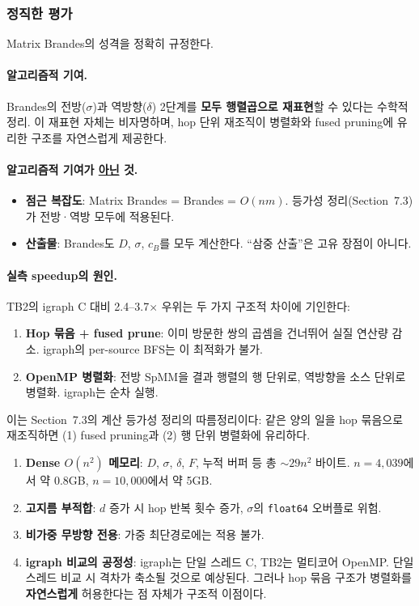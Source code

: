 \documentclass[11pt,a4paper]{article}
\begin{document}
\subsubsection{정직한 평가}

Matrix Brandes의 성격을 정확히 규정한다.

\paragraph{알고리즘적 기여.}
Brandes의 전방($\sigma$)과 역방향($\delta$) 2단계를 \textbf{모두 행렬곱으로 재표현}할 수 있다는 수학적 정리. 이 재표현 자체는 비자명하며, hop 단위 재조직이 병렬화와 fused pruning에 유리한 구조를 자연스럽게 제공한다.

\paragraph{알고리즘적 기여가 \underline{아닌} 것.}
\begin{itemize}
\item \textbf{점근 복잡도}: Matrix Brandes = Brandes = $O(nm)$. 등가성 정리(Section~7.3)가 전방·역방 모두에 적용된다.
\item \textbf{산출물}: Brandes도 $D$, $\sigma$, $c_B$를 모두 계산한다. ``삼중 산출''은 고유 장점이 아니다.
\end{itemize}

\paragraph{실측 speedup의 원인.}
TB2의 igraph C 대비 2.4--3.7$\times$ 우위는 두 가지 구조적 차이에 기인한다:
\begin{enumerate}
\item \textbf{Hop 묶음 + fused prune}: 이미 방문한 쌍의 곱셈을 건너뛰어 실질 연산량 감소. igraph의 per-source BFS는 이 최적화가 불가.
\item \textbf{OpenMP 병렬화}: 전방 SpMM을 결과 행렬의 행 단위로, 역방향을 소스 단위로 병렬화. igraph는 순차 실행.
\end{enumerate}
이는 Section~7.3의 계산 등가성 정리의 따름정리이다: 같은 양의 일을 hop 묶음으로 재조직하면 (1) fused pruning과 (2) 행 단위 병렬화에 유리하다.

\begin{caution}[제약 및 한계]
\begin{enumerate}
\item \textbf{Dense $O(n^2)$ 메모리}: $D$, $\sigma$, $\delta$, $F$, 누적 버퍼 등 총 $\sim 29n^2$ 바이트. $n = 4{,}039$에서 약 0.8GB, $n = 10{,}000$에서 약 5GB.
\item \textbf{고지름 부적합}: $d$ 증가 시 hop 반복 횟수 증가, $\sigma$의 \texttt{float64} 오버플로 위험.
\item \textbf{비가중 무방향 전용}: 가중 최단경로에는 적용 불가.
\item \textbf{igraph 비교의 공정성}: igraph는 단일 스레드 C, TB2는 멀티코어 OpenMP. 단일 스레드 비교 시 격차가 축소될 것으로 예상된다. 그러나 hop 묶음 구조가 병렬화를 \textbf{자연스럽게} 허용한다는 점 자체가 구조적 이점이다.
\end{enumerate}
\end{caution}
\end{document}
